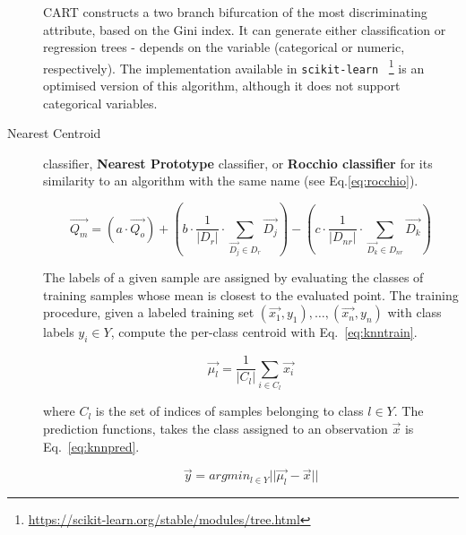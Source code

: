 \begin{description}
	CART constructs a two branch bifurcation of the most discriminating 
	attribute, based on the Gini index. It can generate either classification or 
	regression trees - depends on the variable (categorical or numeric, 
	respectively). The implementation available in 
	\texttt{scikit-learn}~\cite{scikit-learn}
	\footnote{\url{https://scikit-learn.org/stable/modules/tree.html}} is an 
	optimised version of this algorithm, although it does not support 
	categorical variables.
    
    \item [Nearest Centroid] classifier\cite{conformal2014},  \textbf{Nearest 
	Prototype} classifier, or \textbf{Rocchio classifier} for its similarity to 
	an algorithm with the same name (see Eq.\ref{eq:rocchio}). 
    
    \begin{equation}\label{eq:rocchio}
        \overrightarrow{Q_{m}} =  (a \cdot \overrightarrow{Q_{o}}) + (b \cdot 
        \frac{1}{\lvert D_{r} \rvert} \cdot \sum_{\overrightarrow{D_{j}} \in 
        D_{r}} \overrightarrow{D_{j}}) - (c \cdot \frac{1}{\lvert D_{nr} 
        \rvert} \cdot \sum_{\overrightarrow{D_{k}} \in D_{nr}} 
        \overrightarrow{D_{k}})
    \end{equation}
    
    The labels of a given sample are assigned by evaluating the classes of 
	training samples whose mean is closest to the evaluated point. The training 
	procedure, given a labeled training set ${(\overrightarrow{x_{1}}, y_{1}), 
	\ldots,  (\overrightarrow{x_{n}}, y_{n})}$ with class labels $y_{i} \in Y$, compute the per-class centroid with Eq.~\ref{eq:knntrain}.
    
    \begin{equation}\label{eq:knntrain}
        \overrightarrow{\mu _{l}} = \frac{1}{\lvert C_{l} \rvert} \sum_{i \in 
        C_{l}} \overrightarrow{x_{i}}
    \end{equation}
    
    \noindent where $C_{l}$ is the set of indices of samples belonging to class 
	$l \in Y$.  The prediction functions, takes the class assigned to an 
	observation $\overrightarrow{x}$ is Eq.~\ref{eq:knnpred}.
    
    \begin{equation}\label{eq:knnpred}
        \overrightarrow{y} = argmin_{l \in Y} \lvert\lvert \overrightarrow{\mu _{l}} - \overrightarrow{x} \rvert\rvert
    \end{equation}

\end{description}

